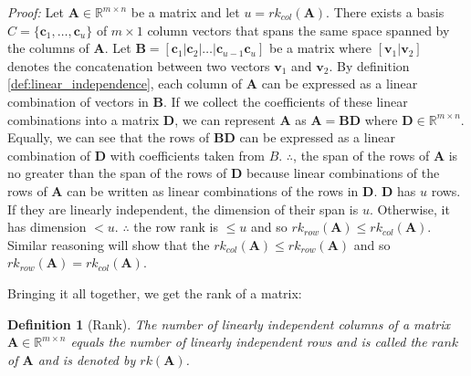 \documentclass[a4paper,12pt]{book}
\newcommand{\matrx}[1]{\bm{#1}}
\newcommand{\vectr}[1]{\textbf{#1}}
\newcommand{\real}{\mathbb{R}}
\newcommand{\italic}[1]{\textit{#1}}
\newcommand{\rrank}[1]{rk_{row}(\matrx{#1})}
\newcommand{\crank}[1]{rk_{col}(\matrx{#1})}
\newtheorem{definition}{Definition}[section]
\begin{document}
	\noindent\italic{Proof:}
	Let $ \matrx{A} \in \real^{m \times n}$ be a matrix and let $ u = \crank{A} $. There exists a basis $ C = \{\vectr{c}_1, \ldots, \vectr{c}_u\} $ of $ m \times 1 $ column vectors that spans the same space spanned by the columns of $ \vectr{A} $. 
	Let $ \matrx{B} = [\vectr{c}_1 | \vectr{c}_2 | \ldots | \vectr{c}_{u - 1} \vectr{c}_u] $ be a matrix where $ [\vectr{v}_1 | \vectr{v}_2] $ denotes the concatenation between two vectors $ \vectr{v}_1 $ and $ \vectr{v}_2 $. By definition \ref{def:linear_independence}, each column of $ \matrx{A} $ can be expressed as a linear combination of vectors in $ \matrx{B} $. If we collect the coefficients of these linear combinations into a matrix $ \matrx{D} $, we can represent $ \matrx{A} $ as $ \matrx{A} = \matrx{BD} $ where $ \matrx{D} \in \real^{m \times n}$. Equally, we can see that the rows of $ \matrx{BD} $ can be expressed as a linear combination of $ \matrx{D} $ with coefficients taken from $ B $. $ \therefore $, the span of the rows of $ \matrx{A} $ is no greater than the span of the rows of $ \matrx{D} $ because linear combinations of the rows of $ \matrx{A} $ can be written as linear combinations of the rows in $ \matrx{D} $. $ \matrx{D} $ has $ u $ rows. If they are linearly independent, the dimension of their span is $ u $. Otherwise, it has dimension $ < u $. $ \therefore $ the row rank is $ \leq u $ and so $ \rrank{A} \leq \crank{A} $. Similar reasoning will show that the $ \crank{A} \leq \rrank{A} $ and so $ \rrank{A} = \crank{A} $.
	
	Bringing it all together, we get the rank of a matrix:
	
	\begin{definition}[Rank]
		\normalfont The number of linearly independent columns of a matrix $\textbf{A} \in \mathbb{R}^{m \times n}$ equals the number of linearly independent rows and is called the $\textit{rank}$ of $\textbf{A}$ and is denoted by $rk(\textbf{A})$.
	\end{definition}

	\printbibliography
\end{document}
